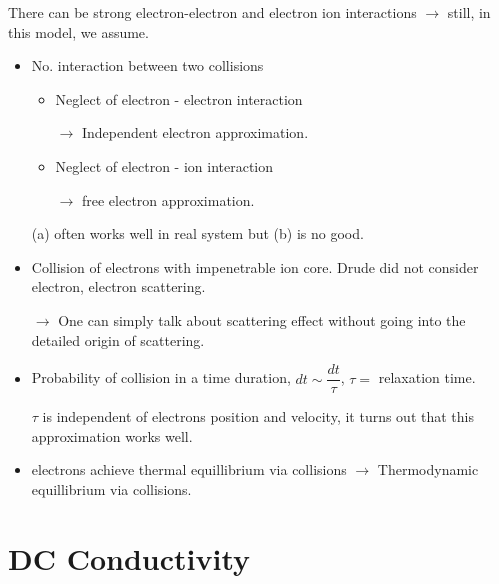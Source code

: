 There can be strong electron-electron and electron ion interactions $\to$ still, in this model, we assume.
\begin{itemize}
\item[(i)] No. interaction between two collisions
\begin{itemize}
\item[(a)] Neglect of electron - electron interaction

$\to$ Independent electron approximation.

\item[(b)] Neglect of electron - ion interaction

$\to$ free electron approximation.
\end{itemize}
(a) often works well in real system but (b) is no good.

\item[(ii)] Collision of electrons with impenetrable ion core. Drude did not consider electron, electron scattering.

$\to$ One can simply talk about scattering effect without going into the detailed origin of scattering.

\item[(iii)] Probability of collision in a time duration, $dt\sim \dfrac{dt}{\tau}$, $\tau=$ relaxation time.

$\tau$ is independent of electrons position and velocity, it turns out that this approximation works well.

\item[(iv)] electrons achieve thermal equillibrium via collisions $\to$ Thermodynamic equillibrium via collisions.
\end{itemize}

\section*{DC Conductivity}





